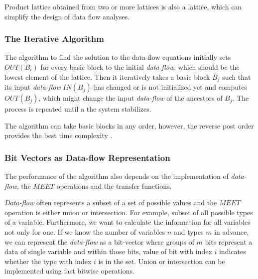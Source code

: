         Product lattice obtained from two or more lattices 
        is also a lattice, which can simplify the design of 
        data flow analyses.        

        \subsubsection*{The Iterative Algorithm}
        
        The algorithm to find the solution to the data-flow equations 
        initially sets $OUT(B_i)$ for every basic block to the initial 
        \emph{data-flow}, which should be the lowest element of the lattice. 
        Then it iteratively takes a basic block $B_j$ such that 
        its input \emph{data-flow} $IN(B_j)$ has changed or is not 
        initialized yet and computes $OUT(B_j)$, which might change 
        the input \emph{data-flow} of the ancestors of $B_j$. 
        The process is repeated until a the system stabilizes. 
        
        The algorithm can take basic blocks in any order, however, 
        the reverse post order provides the best time complexity 
        \cite{aho1985compilers}.
        
        \subsubsection*{Bit Vectors as Data-flow Representation}

        The performance of the algorithm also depends on the implementation 
        of \emph{data-flow}, the $\textit{MEET}$ operations and the transfer 
        functions. 
        
        \emph{Data-flow} often represents a subset of a set of possible values 
        and the $\textit{MEET}$ operation is either union or intersection.
        For example, subset of all possible types of a variable. 
        Furthermore, we want to calculate the information for all 
        variables not only for one. If we know the number of variables $n$ and 
        types $m$ in advance, we can represent the \emph{data-flow} as 
        a bit-vector where groups of $m$ bits represent a data of 
        single variable and within those bits, value of bit with 
        index $i$ indicates whether the type with index $i$ is in the set. 
        Union or intersection can be implemented using fast bitwise operations.


